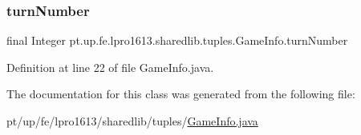\subsubsection{\texorpdfstring{turn\+Number}{turnNumber}}
{\footnotesize\ttfamily final Integer pt.\+up.\+fe.\+lpro1613.\+sharedlib.\+tuples.\+Game\+Info.\+turn\+Number}



Definition at line 22 of file Game\+Info.\+java.



The documentation for this class was generated from the following file\+:\begin{DoxyCompactItemize}
\item 
pt/up/fe/lpro1613/sharedlib/tuples/\hyperlink{_game_info_8java}{Game\+Info.\+java}\end{DoxyCompactItemize}
